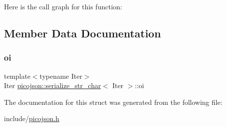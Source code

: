 Here is the call graph for this function\+:


\subsection{Member Data Documentation}
\hypertarget{structpicojson_1_1serialize__str__char_a1abb88801c571a903ef9e3a21388b944}{}\label{structpicojson_1_1serialize__str__char_a1abb88801c571a903ef9e3a21388b944} 
\subsubsection{\texorpdfstring{oi}{oi}}
{\footnotesize\ttfamily template$<$typename Iter$>$ \\
Iter \hyperlink{structpicojson_1_1serialize__str__char}{picojson\+::serialize\+\_\+str\+\_\+char}$<$ Iter $>$\+::oi}



The documentation for this struct was generated from the following file\+:\begin{DoxyCompactItemize}
\item 
include/\hyperlink{picojson_8h}{picojson.\+h}\end{DoxyCompactItemize}
